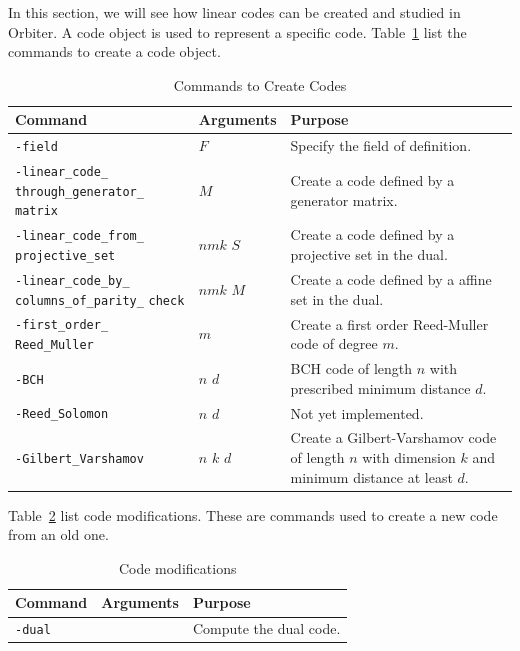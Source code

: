 \bigskip



In this section, we will see how linear codes can be created and studied in Orbiter. 
A code object is used to represent a specific code. 
Table~\ref{tab:code:object} list the commands  to create a code object. 
\begin{table}
	\begin{center}
	\begin{tabular}{|p{4cm}|p{3cm}|p{7cm}|}
		\hline
		Command & Arguments & Purpose \\
		\hline
		\hline
		\verb'-field' & $F$ & Specify the field of definition. \\
		\hline
		\verb'-linear_code_' \verb'through_generator_' \verb'matrix' & $M$ & Create a code defined by a generator matrix. \\
		\hline
		\verb'-linear_code_from_' \verb'projective_set' & $nmk$ $S$ & Create a code defined by a projective set in the dual. \\
		\hline
		\verb'-linear_code_by_' \verb'columns_of_parity_' \verb'check' & $nmk$ $M$ & Create a code defined by a affine set in the dual. \\
		\hline
		\verb'-first_order_' \verb'Reed_Muller' & $m$ & Create a first order Reed-Muller code of degree $m$. \\
		\hline
		\verb'-BCH' & $n$ $d$ & BCH code of length $n$ with prescribed minimum distance $d$. \\
		\hline
		\verb'-Reed_Solomon' & $n$ $d$ &  Not yet implemented. \\
		\hline
		\verb'-Gilbert_Varshamov' & $n$ $k$ $d$ & Create a Gilbert-Varshamov code of length $n$ with dimension $k$ and minimum distance at least $d.$ \\
		\hline
		\end{tabular}
	\end{center}
	\caption{\label{tab:code:object}Commands to Create Codes}
	\end{table}
Table~\ref{tab:code:object:modifications} list code modifications. 
These are commands used to create a new code from an old one. 
\begin{table}
	\begin{center}
	\begin{tabular}{|p{4cm}|p{3cm}|p{7cm}|}
		\hline
		Command & Arguments & Purpose \\
		\hline
		\hline
		\verb'-dual' &  & Compute the dual code. \\
		\hline
		\end{tabular}
	\end{center}
	\caption{\label{tab:code:object:modifications}Code modifications}
	\end{table}

